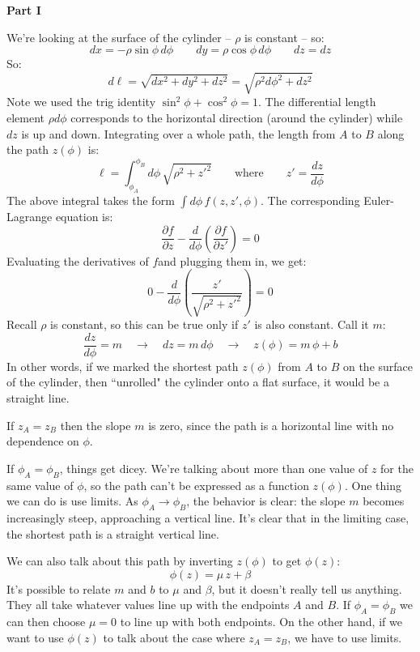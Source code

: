 \documentclass[12pt]{article}
\newcommand{\purple}[1]{{\color{purple} #1}}
\begin{document}
\purple{
\textbf{Part I}

We're looking at the surface of the cylinder -- $\rho$ is constant -- so:
$$
dx = -\rho \sin\phi \, d\phi
\quad \quad
dy = \rho \cos\phi \, d\phi
\quad \quad
dz = dz
$$
So:
$$
d\ell = \sqrt{dx^2 + dy^2 + dz^2} = \sqrt{ \rho^2d\phi^2 + dz^2}
$$
Note we used the trig identity $\sin^2\phi + \cos^2\phi = 1$. The differential length element $\rho d\phi$ corresponds to the horizontal direction (around the cylinder) while $dz$ is up and down. Integrating over a whole path, the length from $A$ to $B$ along the path $z(\phi)$ is:
$$
\ell = \int_{\phi_A}^{\phi_B} d\phi \, \sqrt{ \rho^2 + z'^2 } \quad \quad \mathrm{where} \quad \quad z' = \frac{dz}{d\phi}
$$
The above integral takes the form $\int d\phi \, f(z, z', \phi)$. The corresponding Euler-Lagrange equation is:
$$
\frac{\partial f}{\partial z} - \frac{d}{d\phi} \left( \frac{\partial f}{\partial z'} \right) = 0
$$
Evaluating the derivatives of $f$and plugging them in, we get:
$$
0 - \frac{d}{d\phi} \left( \frac{z'}{\sqrt{\rho^2 + z'^2}} \right) = 0
$$
Recall $\rho$ is constant, so this can be true only if $z'$ is also constant. Call it $m$:
$$
\frac{dz}{d\phi} = m
\quad \rightarrow \quad
dz = m \, d\phi
\quad \rightarrow \quad
z(\phi) = m \, \phi + b
$$
In other words, if we marked the shortest path $z(\phi)$ from $A$ to $B$ on the surface of the cylinder, then ``unrolled" the cylinder onto a flat surface, it would be a straight line. 


If $z_A = z_B$ then the slope $m$ is zero, since the path is a horizontal line with no dependence on $\phi$.

If $\phi_A = \phi_B$, things get dicey. We're talking about more than one value of $z$ for the same value of $\phi$, so the path can't be expressed as a function $z(\phi)$. One thing we can do is use limits. As $\phi_A \rightarrow \phi_B$, the behavior is clear: the slope $m$ becomes increasingly steep, approaching a vertical line. It's clear that in the limiting case, the shortest path is a straight vertical line.

We can also talk about this path by inverting $z(\phi)$ to get $\phi(z)$: 
$$
\phi(z) = \mu \, z + \beta
$$
It's possible to relate $m$ and $b$ to $\mu$ and $\beta$, but it doesn't really tell us anything. They all take whatever values line up with the endpoints $A$ and $B$. 
If $\phi_A = \phi_B$ we can then choose $\mu = 0$ to line up with both endpoints. On the other hand, if we want to use $\phi(z)$ to talk about the case where $z_A = z_B$, we have to use limits.
}
\end{document}
